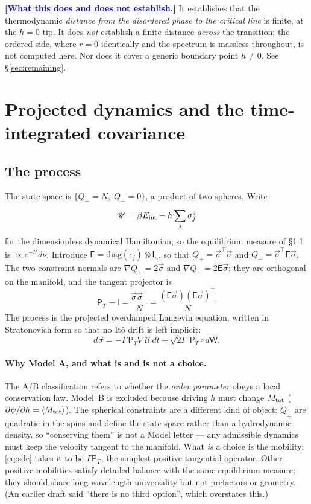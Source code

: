 \documentclass[11pt,a4paper]{article}
\newcommand{\avg}[1]{\left\langle #1 \right\rangle}
\newcommand{\FLAG}[1]{\textcolor{blue}{\textbf{[#1]}}}
\newcommand{\Uc}{\mathscr{U}}          %
\newcommand{\Em}{\mathsf{E}}
\newcommand{\Pt}{\mathsf{P}_{T}}
\newcommand{\bs}{\vec\sigma}
\newcommand{\avg}[1]{\left\langle #1 \right\rangle}
\newcommand{\FLAG}[1]{\textcolor{blue}{\textbf{[#1]}}}
\begin{document}
\FLAG{What this does and does not establish.} It establishes that the thermodynamic
\emph{distance from the disordered phase to the critical line} is finite, at the $h=0$ tip.
It does \emph{not} establish a finite distance \emph{across} the transition: the ordered
side, where $r=0$ identically and the spectrum is massless throughout, is not computed here.
Nor does it cover a generic boundary point $h\neq0$. See \S\ref{sec:remaining}.


\section{Projected dynamics and the time-integrated covariance}

\subsection{The process}
The state space is $\{Q_+=N,\;Q_-=0\}$, a product of two spheres. Write
\begin{equation}
  \Uc=\beta E_{\rm int}-h\sum_j\sigma^z_j
\end{equation}
for the dimensionless dynamical Hamiltonian, so the equilibrium measure of \S1.1 is
$\propto e^{-\Uc}d\nu$. Introduce $\Em=\mathrm{diag}(\epsilon_j)\otimes\mathsf I_n$, so that
$Q_+=\bs^\top\bs$ and $Q_-=\bs^\top\Em\bs$. The two constraint normals are
$\nabla Q_+=2\bs$ and $\nabla Q_-=2\Em\bs$; they are orthogonal on the manifold, and the
tangent projector is
\begin{equation}
  \boxed{\ \Pt=\mathsf I-\frac{\bs\bs^\top}{N}-\frac{(\Em\bs)(\Em\bs)^\top}{N}\ }
  \label{eq:projector}
\end{equation}
The process is the projected overdamped Langevin equation, written in Stratonovich form so
that no It\^o drift is left implicit:
\begin{equation}
  d\bs=-\Gamma\,\Pt\nabla\Uc\,dt+\sqrt{2\Gamma}\,\Pt\circ d\mathsf W .
  \label{eq:sde}
\end{equation}

\paragraph{Why Model A, and what is and is not a choice.} The A/B classification refers to
whether the \emph{order parameter} obeys a local conservation law. Model~B is excluded
because driving $h$ must change $M_{\rm tot}$ ($\partial\psi/\partial h=\avg{M_{\rm tot}}$).
The spherical constraints are a different kind of object: $Q_\pm$ are quadratic in the spins
and define the state space rather than a hydrodynamic density, so ``conserving them'' is not
a Model letter --- any admissible dynamics must keep the velocity tangent to the manifold.
What \emph{is} a choice is the mobility: \eqref{eq:sde} takes it to be $\Gamma\Pt$, the
simplest positive tangential operator. Other positive mobilities satisfy detailed balance
with the same equilibrium measure; they should share long-wavelength universality but not
prefactors or geometry. (An earlier draft said ``there is no third option'', which
overstates this.)
\end{document}
